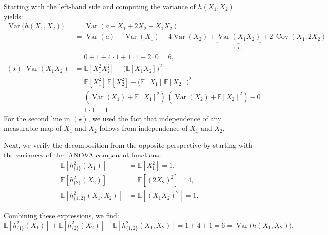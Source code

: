 Starting with the left-hand side and computing the variance of $h(X_1,X_2)$ yields:
\begin{align*}
\operatorname{Var}\big(h(X_1,X_2)\big)
&= \operatorname{Var}(a + X_1 + 2X_2 + X_1X_2) \\
&= \operatorname{Var}(a) + \operatorname{Var}(X_1) + 4\operatorname{Var}(X_2)
   + \underbrace{\operatorname{Var}(X_1X_2)}_{(\star)}
   + 2\,\operatorname{Cov}(X_1,2X_2) \\
&= 0 + 1 + 4 \cdot 1 + 1 \cdot 1 + 2\cdot 0 = 6, \\[0.3em]
(\star)\;\operatorname{Var}(X_1X_2)
&= \mathbb{E}[X_1^2 X_2^2] - \big(\mathbb{E}[X_1 X_2]\big)^2 \\
&=\mathbb{E}[X_1^2]\,\mathbb{E}[X_2^2]
   - \big(\mathbb{E}[X_1]\,\mathbb{E}[X_2]\big)^2 \\
&= (\operatorname{Var}(X_1)+\mathbb{E}[X_1]^2)\,
   (\operatorname{Var}(X_2)+\mathbb{E}[X_2]^2) - 0 \\
&= 1\cdot 1 = 1.
\end{align*}
For the second line in $(\star)$, we used the fact that independence of any measurable map of $X_1$ and $X_2$ follows from independence of $X_1$ and $X_2$.

Next, we verify the decomposition from the opposite perspective by starting with the variances of the fANOVA component functions:
\begin{align*}
\mathbb{E}[h_{\{1\}}^2(X_1)] 
    &= \mathbb{E}[X_1^2] 
    = 1, \\[0.5em]
\mathbb{E}[h_{\{2\}}^2(X_2)] 
    &= \mathbb{E}[(2X_2)^2] 
    = 4, \\[0.5em]
\mathbb{E}[h_{\{1,2\}}^2(X_1,X_2)] 
    &= \mathbb{E}[(X_1 X_2)^2] 
    = 1.
\end{align*}

Combining these expressions, we find:
\[
 \mathbb{E}[h_{\{1\}}^2(X_1)] + \mathbb{E}[h_{\{2\}}^2(X_2)] + \mathbb{E}[h_{\{1,2\}}^2(X_1,X_2)] 
 = 1 + 4 + 1 = 6
 = \operatorname{Var}\big(h(X_1,X_2)\big).
\]








